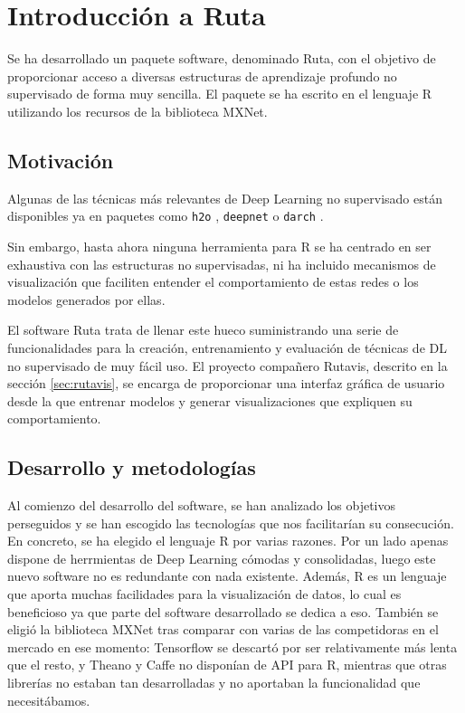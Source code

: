 \section{Introducción a Ruta}\label{el-paquete-ruta}

Se ha desarrollado un paquete software, denominado Ruta, con el
objetivo de proporcionar acceso a diversas estructuras de aprendizaje profundo no supervisado de forma muy sencilla. El paquete se ha escrito en el lenguaje R utilizando los recursos de la biblioteca MXNet.

\subsection{Motivación}

Algunas de las técnicas más relevantes de Deep Learning no supervisado
están disponibles ya en paquetes como \texttt{h2o} \autocite{h2o},
\texttt{deepnet} \autocite{deepnet} o \texttt{darch} \autocite{darch}.

Sin embargo, hasta ahora ninguna herramienta para R se ha centrado en ser exhaustiva con las estructuras no supervisadas, ni ha incluido mecanismos de visualización que faciliten entender el comportamiento de
estas redes o los modelos generados por ellas.

El software Ruta trata de llenar este hueco suministrando una serie de funcionalidades para la creación, entrenamiento y evaluación de técnicas de DL no supervisado de muy fácil uso. El proyecto compañero Rutavis, descrito en la sección \ref{sec:rutavis}, se encarga de proporcionar una interfaz gráfica de usuario desde la que entrenar modelos y generar visualizaciones que expliquen su comportamiento.

\subsection{Desarrollo y metodologías}\label{metodologuxeda-de-desarrollo}

Al comienzo del desarrollo del software, se han analizado los objetivos perseguidos y se han escogido las tecnologías que nos facilitarían su consecución. En concreto, se ha elegido el lenguaje R por varias razones. Por un lado apenas dispone de herrmientas de Deep Learning cómodas y consolidadas, luego este nuevo software no es redundante con nada existente. Además, R es un lenguaje que aporta muchas facilidades para la visualización de datos, lo cual es beneficioso ya que parte del software desarrollado se dedica a eso. También se eligió la biblioteca MXNet tras comparar con varias de las competidoras en el mercado en ese momento: Tensorflow se descartó por ser relativamente más lenta que el resto, y Theano y Caffe no disponían de API para R, mientras que otras librerías no estaban tan desarrolladas y no aportaban la funcionalidad que necesitábamos.

